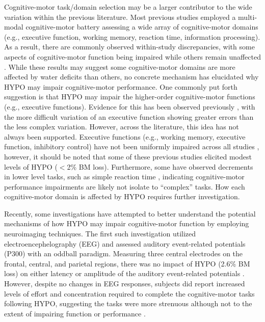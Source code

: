 Cognitive-motor task/domain selection may be a larger contributor to the wide variation within the previous literature. Most previous studies employed a multi-modal cognitive-motor battery assessing a wide array of cognitive-motor domains (e.g., executive function, working memory, reaction time, information processing). As a result, there are commonly observed within-study discrepancies, with some aspects of cognitive-motor function being impaired while others remain unaffected \cite{ganio_mild_2011}. While these results may suggest some cognitive-motor domains are more affected by water deficits than others, no concrete mechanism has elucidated why HYPO may impair cognitive-motor performance. One commonly put forth suggestion is that HYPO may impair the higher-order cognitive-motor functions (e.g., executive functions). Evidence for this has been observed previously \cite{tomporowski_effects_2007}, with the more difficult variation of an executive function showing greater errors than the less complex variation. However, across the literature, this idea has not always been supported. Executive functions (e.g., working memory, executive function, inhibitory control) have not been uniformly impaired across all studies \cite{wittbrodt_exercise-induced_2015,armstrong_mild_2012,danci_voluntary_2009,kakos_improving_2013,turner_mild_2017}, however, it should be noted that some of these previous studies elicited modest levels of HYPO ($<$2\% BM loss). Furthermore, some have observed decrements in lower level tasks, such as simple reaction time \cite{barroso_hydration_2014,mcmorris_heat_2006}, indicating cognitive-motor performance impairments are likely not isolate to ``complex'' tasks. How each cognitive-motor domain is affected by HYPO requires further investigation.    

Recently, some investigations have attempted to better understand the potential mechanisms of how HYPO may impair cognitive-motor function by employing neuroimaging techniques. The first such investigation \cite{szinnai_effect_2005} utilized electroencephelography (EEG) and assessed auditory event-related potentials (P300) with an oddball paradigm. Measuring three central electrodes on the frontal, central, and parietal regions, there was no impact of HYPO (2.6\% BM loss) on either latency or amplitude of the auditory event-related potentials \cite{szinnai_effect_2005}. However, despite no changes in EEG responses, subjects did report increased levels of effort and concentration required to complete the cognitive-motor tasks following HYPO, suggesting the tasks were more strenuous although not to the extent of impairing function or performance \cite{szinnai_effect_2005}. 

